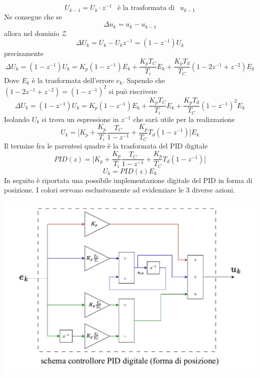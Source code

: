 \documentclass[10pt, letterpaper]{report}
\begin{document}
$$ U_{k-1}=U_k\cdot z^{-1}\ \  \text{ è la trasformata di }\ \  u_{k-1}$$
Ne consegue che se 
$$ \Delta u_k = u_k-u_{k-1}$$ 
allora nel dominio $\mathcal Z$
$$ \Delta U_k = U_k-U_kz^{-1}=(1-z^{-1})U_k$$
precisamente
$$ 
\Delta U_k =(1-z^{-1})U_k= K_p(1-z^{-1})E_k+\frac{K_pT_C}{T_i}E_k+\frac{K_pT_d}{T_C}(1-2z^{-1}+z^{-2})E_k
$$
Dove $E_k$ è la trasformata dell'errore $e_k$. Sapendo che $(1-2z^{-1}+z^{-2})=(1-z^{-1})^2$ si può riscrivere  
$$ 
\Delta U_k =(1-z^{-1})U_k=  K_p(1-z^{-1})E_k+\frac{K_pT_C}{T_i}E_k+\frac{K_pT_d}{T_C}(1-z^{-1})^2E_k
$$
Isolando $U_k$ si trova un espressione in $z^{-1}$ che sarà utile per la realizzazione
$$ 
U_k=\Big[ K_p+\frac{K_p}{T_i}\frac{T_C}{1-z^{-1}}+\frac{K_p}{T_C}T_d(1-z^{-1})  \Big]E_k
$$
Il termine fra le parentesi quadre è la trasformata del PID digitale
$$ 
PID(z)=\Big[ K_p+\frac{K_p}{T_i}\frac{T_C}{1-z^{-1}}+\frac{K_p}{T_C}T_d(1-z^{-1})  \Big]
$$
$$ 
U_k=PID(z)E_k
$$
In seguito è riportata una possibile implementazione digitale del PID in forma di posizione. I colori servono esclusivamente ad evidenziare le 3 diverse azioni.
\begin{center}
    \includegraphics[width=1\textwidth]{images/schemaPIDdigitale.pdf}
\end{center}
\end{document}

